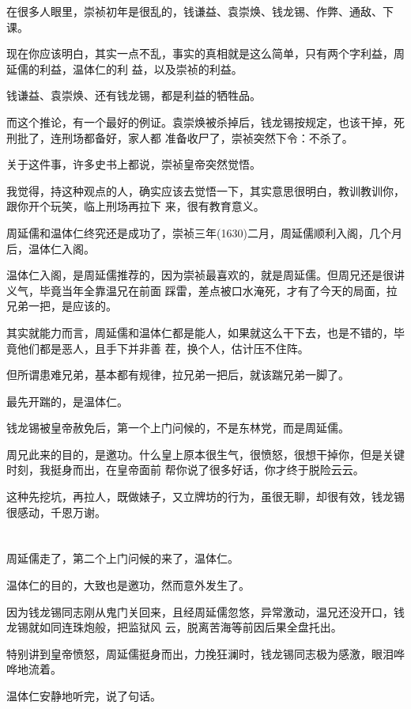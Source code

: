 \documentclass[11pt,a4paper,onecolumn]{article}
\begin{document}
在很多人眼里，崇祯初年是很乱的，钱谦益、袁崇焕、钱龙锡、作弊、通敌、下课。

现在你应该明白，其实一点不乱，事实的真相就是这么简单，只有两个字\myrule 利益，周延儒的利益，温体仁的利
益，以及崇祯的利益。

钱谦益、袁崇焕、还有钱龙锡，都是利益的牺牲品。

而这个推论，有一个最好的例证。袁崇焕被杀掉后，钱龙锡按规定，也该干掉，死刑批了，连刑场都备好，家人都
准备收尸了，崇祯突然下令：不杀了。

关于这件事，许多史书上都说，崇祯皇帝突然觉悟。

我觉得，持这种观点的人，确实应该去觉悟一下，其实意思很明白，教训教训你，跟你开个玩笑，临上刑场再拉下
来，很有教育意义。

周延儒和温体仁终究还是成功了，崇祯三年(1630)二月，周延儒顺利入阁，几个月后，温体仁入阁。

温体仁入阁，是周延儒推荐的，因为崇祯最喜欢的，就是周延儒。但周兄还是很讲义气，毕竟当年全靠温兄在前面
踩雷，差点被口水淹死，才有了今天的局面，拉兄弟一把，是应该的。

其实就能力而言，周延儒和温体仁都是能人，如果就这么干下去，也是不错的，毕竟他们都是恶人，且手下并非善
茬，换个人，估计压不住阵。

但所谓患难兄弟，基本都有规律，拉兄弟一把后，就该踹兄弟一脚了。

最先开踹的，是温体仁。

钱龙锡被皇帝赦免后，第一个上门问候的，不是东林党，而是周延儒。

周兄此来的目的，是邀功。什么皇上原本很生气，很愤怒，很想干掉你，但是关键时刻，我挺身而出，在皇帝面前
帮你说了很多好话，你才终于脱险云云。

这种先挖坑，再拉人，既做婊子，又立牌坊的行为，虽很无聊，却很有效，钱龙锡很感动，千恩万谢。

\section[\thesection]{}

周延儒走了，第二个上门问候的来了，温体仁。

温体仁的目的，大致也是邀功，然而意外发生了。

因为钱龙锡同志刚从鬼门关回来，且经周延儒忽悠，异常激动，温兄还没开口，钱龙锡就如同连珠炮般，把监狱风
云，脱离苦海等前因后果全盘托出。

特别讲到皇帝愤怒，周延儒挺身而出，力挽狂澜时，钱龙锡同志极为感激，眼泪哗哗地流着。

温体仁安静地听完，说了句话。
\end{document}

